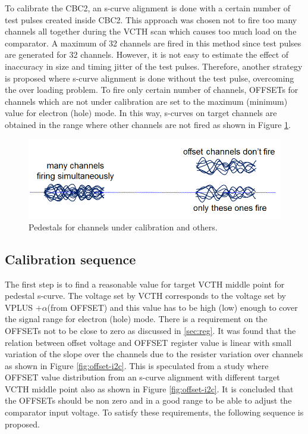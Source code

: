 \documentclass[11pt,a4paper]{article}
\begin{document}
	To calibrate the CBC2, an s-curve alignment is done with a certain number of test pulses created inside CBC2.  This approach was chosen not to fire too many channels all together during
	the VCTH scan which causes too much load on the comparator. A maximum of 32 channels are fired in this method since test pulses are generated for 32 channels.
	However, it is not easy to estimate the effect of inaccuracy in size and timing jitter of the test pulses.
	Therefore, another strategy is proposed where s-curve alignment is done without the test pulse, overcoming the over loading problem. 
To fire only certain number of channels, OFFSETs for channels which are not under calibration are set to the maximum (minimum) value for electron (hole)
	mode.  In this way, s-curves on target channels are obtained in the range where other channels are not fired as shown in Figure \ref{fig:pedestals}.

	\begin{figure}[htbp]
	\centering
	\includegraphics[width=\textwidth]{fig/pedestals.png}
	\caption{Pedestals for channels under calibration and others. }\label{fig:pedestals}
	\end{figure}

	\subsection{Calibration sequence}\label{subsec:calib-sequence}

	The first step is to find a reasonable value for target VCTH middle point for pedestal s-curve.  
The voltage set by VCTH corresponds to the voltage set by VPLUS $+\alpha$(from OFFSET) 
	and this value has to be high (low) enough to cover the signal range for electron (hole) mode.
	There is a requirement on the OFFSETs not to be close to zero as discussed in \ref{sec:reg}. 
	It was found that the relation between offset voltage and OFFSET register value is 
	linear with small variation of the slope over the channels due to the resister variation over channels as shown in Figure \ref{fig:offset-i2c}.
	This is speculated from a study where OFFSET value distribution from an s-curve alignment with different target VCTH middle point also as shown in Figure \ref{fig:offset-i2c}. It is concluded that the OFFSETs should be non zero and in a good range to be able to adjust the comparator input voltage. To satisfy these requirements, the following sequence is proposed. 
\end{document}
